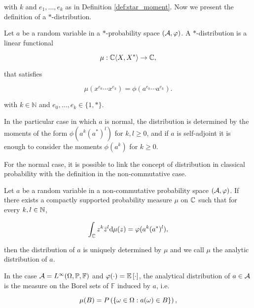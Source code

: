    \noindent with $k$ and $e_1, \dots, e_k$ as in Definition \ref{def:star_moment}. Now we present the definition of a $*$-distribution.

    \begin{definition}
        Let $a$ be a random variable in a $*$-probability space $(\A,\phi)$. A $*$-distribution is a linear functional

        \begin{equation*}
            \mu : \C\langle X, X^*\rangle \to \C,
        \end{equation*}

        \noindent that satisfies

        \begin{equation*}
            \mu(x^{e_0}\cdots x^{e_k}) = \phi(a^{e_0}\cdots a^{e_k}).
        \end{equation*}

        \noindent with $k \in \mathbb{N}$ and $e_0, \dots, e_k \in \{1,*\}$.
    \end{definition}

    In the particular case in which $a$ is normal, the distribution is determined by the moments of the form $\phi(a^k(a^*)^l)$ for $k,l \ge 0$, and if $a$ is self-adjoint it is enough to consider the moments $\phi(a^k)$ for $k\ge 0$. 
    
    For the normal case, it is possible to link the concept of distribution in classical probability with the definition in the non-commutative case.

    \begin{definition}
        Let $a$ be a random variable in a non-commutative probability space $(\A,\phi)$. If there exists a compactly supported probability measure $\mu$ on $\C$ such that for every $k,l\in \N$,

        \begin{equation*}
            \int_\C z^k \bar{z}^l \d \mu(z) = \phi(a^k(a^*)^l),
        \end{equation*}

        then the distribution of $a$ is uniquely determined by $\mu$ and we call $\mu$ the analytic distribution of $a$.
    \end{definition}

    In the case $\A = L^{\infty}(\Omega,\mathbb P, \mathbb F)$ and $\phi(\cdot) = \E{\cdot}$, the analytical distribution of $a \in \A$ is the measure on the Borel sets of $\mathbb F$ induced by $a$, i.e.

    \begin{equation*}
        \mu(B) = \P{ \{ \omega \in \Omega : a(\omega) \in B \} },
    \end{equation*}

